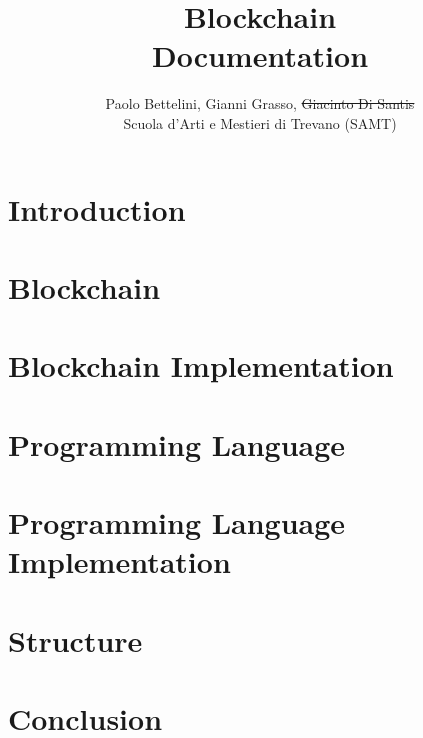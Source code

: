\documentclass{article}
\title{
    Blockchain \\
    \large Documentation}
\author{
    Paolo Bettelini, Gianni Grasso, \sout{Giacinto Di Santis} \\
    \large Scuola d'Arti e Mestieri di Trevano (SAMT)}
\date{}
\begin{document}
\maketitle

\pagebreak

\tableofcontents

\pagebreak

\section{Introduction}



\pagebreak

\section{Blockchain}



\pagebreak

\section{Blockchain Implementation}



\pagebreak

\section{Programming Language}



\pagebreak

\section{Programming Language Implementation}



\pagebreak

\section{Structure}



\pagebreak

\section{Conclusion}
\end{document}
